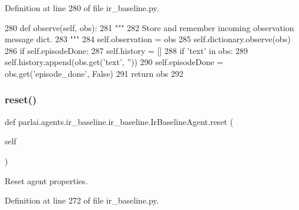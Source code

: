 Definition at line 280 of file ir\+\_\+baseline.\+py.


\begin{DoxyCode}
280     \textcolor{keyword}{def }observe(self, obs):
281         \textcolor{stringliteral}{"""}
282 \textcolor{stringliteral}{        Store and remember incoming observation message dict.}
283 \textcolor{stringliteral}{        """}
284         self.observation = obs
285         self.dictionary.observe(obs)
286         \textcolor{keywordflow}{if} self.episodeDone:
287             self.history = []
288         \textcolor{keywordflow}{if} \textcolor{stringliteral}{'text'} \textcolor{keywordflow}{in} obs:
289             self.history.append(obs.get(\textcolor{stringliteral}{'text'}, \textcolor{stringliteral}{''}))
290         self.episodeDone = obs.get(\textcolor{stringliteral}{'episode\_done'}, \textcolor{keyword}{False})
291         \textcolor{keywordflow}{return} obs
292 
\end{DoxyCode}
\mbox{\label{classparlai_1_1agents_1_1ir__baseline_1_1ir__baseline_1_1IrBaselineAgent_adc3f036e92741d87db95e47dfc5fc0ef}} 
\subsubsection{\texorpdfstring{reset()}{reset()}}
{\footnotesize\ttfamily def parlai.\+agents.\+ir\+\_\+baseline.\+ir\+\_\+baseline.\+Ir\+Baseline\+Agent.\+reset (\begin{DoxyParamCaption}\item[{}]{self }\end{DoxyParamCaption})}

\begin{DoxyVerb}Reset agent properties.
\end{DoxyVerb}
 

Definition at line 272 of file ir\+\_\+baseline.\+py.


